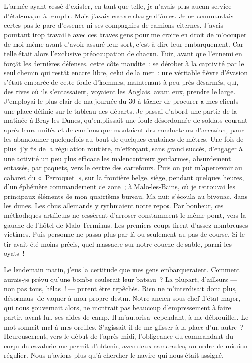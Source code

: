 \documentclass[french,twoside]{book} %
\begin{document}
L’armée ayant cessé d’exister, en tant que telle, je n’avais plus aucun service d’état-major à remplir. Mais j’avais encore charge d’âmes. Je ne commandais certes pas le parc d’essence ni ses compagnies de camions-citernes. J’avais pourtant trop travaillé avec ces braves gens pour me croire en droit de m’occuper de moi-même avant d’avoir assuré leur sort, c’est-à-dire leur embarquement. Car telle était alors l’exclusive préoccupation de chacun. Fuir, avant que l’ennemi en forçât les dernières défenses, cette côte maudite ; se dérober à la captivité par le seul chemin qui restât encore libre, celui de la mer : une véritable fièvre d’évasion s’était emparée de cette foule d’hommes, maintenant à peu près désarmés, qui, des rives où ils s’entassaient, voyaient les Anglais, avant eux, prendre le large. J’employai le plus clair de ma journée du 30 à tâcher de procurer à mes clients une place définie sur le tableau des départs. Je passai d’abord une partie de la matinée à Bray-les-Dunes, qu’emplissait une foule désordonnée de soldats courant après leurs unités et de camions que montaient des conducteurs d’occasion, pour les abandonner quelquefois au bout de quelques centaines de mètres. Une fois de plus, j’y fis de la régulation   routière, m’efforçant, sans grand succès, d’engager à une activité un peu plus efficace les malencontreux gendarmes, absurdement entassés, par paquets, vers le centre des carrefours. Puis on put m’apercevoir au cabaret du « Perroquet », sur la frontière belge, siège, pendant quelques heures, d’un éphémère commandement de zone ; à Malo-les-Bains, où je retrouvai les principaux éléments de mon quatrième bureau. Ma nuit s’écoula au bivouac, dans les dunes. Les obus allemands y rythmaient notre repos. Par bonheur, ces méthodiques artilleurs ne cessèrent d’arroser constamment le même point, vers la gauche de l’hôtel de Malo-Terminus. Les premiers coups firent d’assez nombreuses victimes. Puis personne ne passa plus par là ou seulement au pas de course. Si le tir avait été moins précis, quel massacre sur notre couche de sable, parmi les oyats !\par
Le lendemain matin, j’eus la certitude que mes gens embarqueraient. Comment aurais-je prévu qu’une bombe coulerait leur bateau ? La plupart, d’ailleurs — non pas tous, hélas ! — purent être repêchés. Rien ne m’interdisait donc plus, désormais, de vaquer à mon propre destin. Notre ancien sous-chef d’état-major, qui nous gouvernait alors, ne montrait pas beaucoup d’empressement à faire partir, avant lui, ses aides de camp. Il m’autorisa, cependant, à me débrouiller. Le mot sonnait mal à mes oreilles. S’agissait-il de me glisser à la place d’un autre ? Heureusement, vers le début de l’après-midi, l’obligeance du commandant du corps de cavalerie me permit d’obtenir, avec deux camarades, un ordre de mission régulier. Nous n’avions plus qu’à chercher le navire qui nous était assigné.\par
\end{document}
